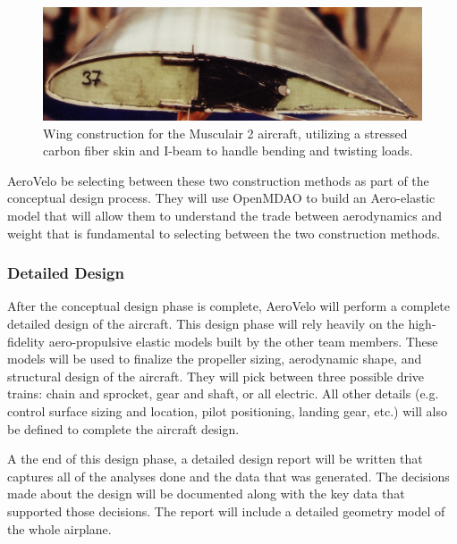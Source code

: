 \documentclass[]{aiaa-tc}
\begin{document}
        \begin{figure}[!hbt]
                \centering
                \includegraphics[width=.75\textwidth]{images/musculair2-wing-construction}
                \caption{Wing construction for the Musculair 2 aircraft, utilizing a stressed carbon fiber skin and I-beam 
                to handle bending and twisting loads.}
                \label{fig:musculair-wing-construction}
        \end{figure}

        AeroVelo be selecting between these two construction methods as part of the conceptual design process. They will use 
        OpenMDAO to build an Aero-elastic model that will allow them to understand the trade between aerodynamics and weight 
        that is fundamental to selecting between the two construction methods. 

        \subsubsection{Detailed Design}

        After the conceptual design phase is complete, AeroVelo will perform a complete detailed design of the aircraft. This 
        design phase will rely heavily on the high-fidelity aero-propulsive elastic models built by the other team members. 
        These models will be used to finalize the propeller sizing, aerodynamic shape, and structural design of the aircraft. They will pick 
        between three possible drive trains: chain and sprocket, gear and shaft, or all electric. All other details (e.g. control
        surface sizing and location, pilot positioning, landing gear, etc.) will also be defined to complete the aircraft 
        design. 

        A the end of this design phase, a detailed design report will be written that captures all of the analyses done 
        and the data that was generated. The decisions made about the design will be documented along with the key data that 
        supported those decisions. The report will include a detailed geometry model of the whole airplane. 
\end{document}
